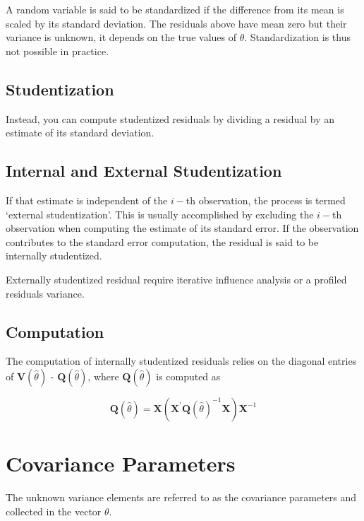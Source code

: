 \documentclass[Main.tex]{subfiles}
\begin{document}
A random variable is said to be standardized if the difference from its mean is scaled by its standard deviation. The residuals above have mean zero but their variance is unknown, it depends on the true values of $\theta$. Standardization is thus not possible in practice.

\subsection{Studentization} %
Instead, you can compute studentized residuals by dividing a residual by an estimate of its standard deviation. 

\subsection{Internal and External Studentization} %
If that estimate is independent of the $i-$th observation, the process is termed `external studentization'. This is usually accomplished by excluding the $i-$th observation when computing the estimate of its standard error. If the observation contributes to the
standard error computation, the residual is said to be internally studentized.

Externally  studentized residual require iterative influence analysis or a profiled residuals variance.


\subsection{Computation}%

The computation of internally studentized residuals relies on the diagonal entries of $\boldsymbol{V} (\hat{\theta})$ - $\boldsymbol{Q} (\hat{\theta})$, where $\boldsymbol{Q} (\hat{\theta})$ is computed as

\[ \boldsymbol{Q} (\hat{\theta}) = \boldsymbol{X} ( \boldsymbol{X}^{\prime}\boldsymbol{Q} (\hat{\theta})^{-1}\boldsymbol{X})\boldsymbol{X}^{-1} \]


\newpage
\section{Covariance Parameters} %
The unknown variance elements are referred to as the covariance parameters and collected in the vector $\theta$.
\end{document}
